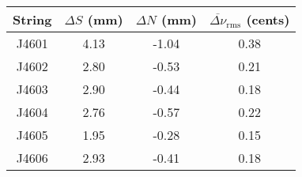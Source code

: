 \begin{tabular}{cccc}
\toprule
String &  $\Delta S$ (mm) &  $\Delta N$ (mm) &  $\overline{\Delta \nu}_\text{rms}$ (cents) \\
\midrule
 J4601 &             4.13 &            -1.04 &                                        0.38 \\
 J4602 &             2.80 &            -0.53 &                                        0.21 \\
 J4603 &             2.90 &            -0.44 &                                        0.18 \\
 J4604 &             2.76 &            -0.57 &                                        0.22 \\
 J4605 &             1.95 &            -0.28 &                                        0.15 \\
 J4606 &             2.93 &            -0.41 &                                        0.18 \\
\bottomrule
\end{tabular}

